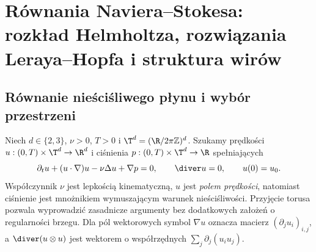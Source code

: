 \chapter[Równania Naviera--Stokesa]{Równania Naviera--Stokesa: rozkład Helmholtza, rozwiązania Leraya--Hopfa i struktura wirów}
\label{chap:pde28}

\section{Równanie nieściśliwego płynu i wybór przestrzeni}
Niech $d\in\{2,3\}$, $\nu>0$, $T>0$ i $\T^d=(\R/2\pi\mathbb Z)^d$.
Szukamy prędkości $u:(0,T)\times\T^d\to\R^d$ i ciśnienia
$p:(0,T)\times\T^d\to\R$ spełniających
\begin{equation}\label{eq:pde28-ns}
 \partial_tu+(u\cdot\nabla)u-\nu\Delta u+\nabla p=0,
 \qquad \diver u=0,
 \qquad u(0)=u_0.
\end{equation}
Współczynnik $\nu$ jest lepkością kinematyczną, $u$ jest \emph{polem
prędkości}, natomiast ciśnienie jest mnożnikiem wymuszającym warunek
nieściśliwości. Przyjęcie torusa pozwala wyprowadzić zasadnicze
argumenty bez dodatkowych założeń o regularności brzegu. Dla
pól wektorowych symbol $\nabla u$ oznacza macierz
$(\partial_j u_i)_{i,j}$, a $\diver(u\otimes u)$ jest wektorem
o współrzędnych $\sum_j\partial_j(u_i u_j)$.

